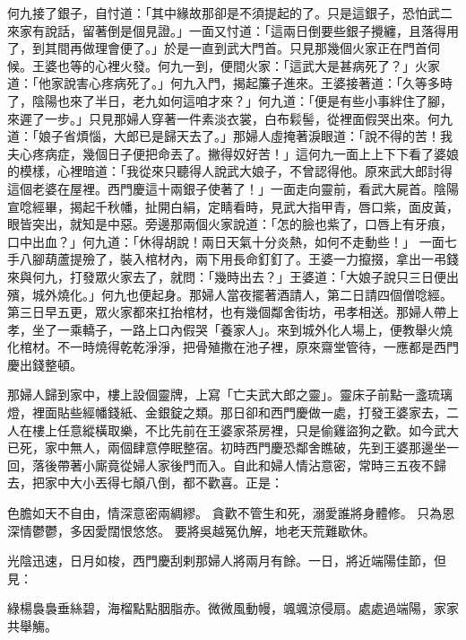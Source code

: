 \begin{showcontents}{}
何九接了銀子，自忖道：「其中緣故那卻是不須提起的了。只是這銀子，恐怕武二來家有說話，留著倒是個見證。」一面又忖道：「這兩日倒要些銀子攪纏，且落得用了，到其間再做理會便了。」於是一直到武大門首。只見那幾個火家正在門首伺候。王婆也等的心裡火發。何九一到，便間火家：「這武大是甚病死了？」火家道：「他家說害心疼病死了。」何九入門，揭起簾子進來。王婆接著道：「久等多時了，陰陽也來了半日，老九如何這咱才來？」何九道：「便是有些小事絆住了腳，來遲了一步。」只見那婦人穿著一件素淡衣裳，白布鬏髻，從裡面假哭出來。何九道：「娘子省煩惱，大郎已是歸天去了。」那婦人虛掩著淚眼道：「說不得的苦！我夫心疼病症，幾個日子便把命丟了。撇得奴好苦！」這何九一面上上下下看了婆娘的模樣，心裡暗道：「我從來只聽得人說武大娘子，不曾認得他。原來武大郎討得這個老婆在屋裡。西門慶這十兩銀子使著了！」一面走向靈前，看武大屍首。陰陽宣唸經畢，揭起千秋幡，扯開白絹，定睛看時，見武大指甲青，唇口紫，面皮黃，眼皆突出，就知是中惡。旁邊那兩個火家說道：「怎的臉也紫了，口唇上有牙痕，口中出血？」何九道：「休得胡說！兩日天氣十分炎熱，如何不走動些！」 一面七手八腳葫蘆提殮了，裝入棺材內，兩下用長命釘釘了。王婆一力攛掇，拿出一弔錢來與何九，打發眾火家去了，就問：「幾時出去？」王婆道：「大娘子說只三日便出殯，城外燒化。」何九也便起身。那婦人當夜擺著酒請人，第二日請四個僧唸經。第三日早五更，眾火家都來扛抬棺材，也有幾個鄰舍街坊，弔孝相送。那婦人帶上孝，坐了一乘轎子，一路上口內假哭「養家人」。來到城外化人場上，便教舉火燒化棺材。不一時燒得乾乾淨淨，把骨殖撒在池子裡，原來齋堂管待，一應都是西門慶出錢整頓。

那婦人歸到家中，樓上設個靈牌，上寫「亡夫武大郎之靈」。靈床子前點一盞琉璃燈，裡面貼些經幡錢紙、金銀錠之類。那日卻和西門慶做一處，打發王婆家去，二人在樓上任意縱橫取樂，不比先前在王婆家茶房裡，只是偷雞盜狗之歡。如今武大已死，家中無人，兩個肆意停眠整宿。初時西門慶恐鄰舍瞧破，先到王婆那邊坐一回，落後帶著小廝竟從婦人家後門而入。自此和婦人情沾意密，常時三五夜不歸去，把家中大小丟得七顛八倒，都不歡喜。正是：

色膽如天不自由，情深意密兩綢繆。
貪歡不管生和死，溺愛誰將身體修。
只為恩深情鬱鬱，多因愛闊恨悠悠。
要將吳越冤仇解，地老天荒難歇休。

光陰迅速，日月如梭，西門慶刮剌那婦人將兩月有餘。一日，將近端陽佳節，但見：

綠楊裊裊垂絲碧，海榴點點胭脂赤。微微風動幔，颯颯涼侵扇。處處過端陽，家家共舉觴。


\end{showcontents}
